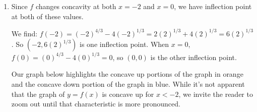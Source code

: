 \documentclass{ximera}
\begin{document}
\begin{example}
\begin{explanation}
\begin{enumerate}
\begin{image}
\end{image}

Using Theorem \ref{secondderivatveandgraphs} we get:

\begin{image}
\end{image}

We see $f$ is concave up on $(-\infty, -2)$ and again from $(0, \infty)$.  $f$ is concave down on $(-2,0)$.

\item  Since $f$ changes concavity at both $x=-2$ and $x=0$, we have inflection point at both of these values.  



We find:  $f(-2) = (-2)^{4/3} - 4(-2)^{1/3} = 2 (2)^{1/3} + 4 (2)^{1/3} = 6 (2)^{1/3}$. So $\left(-2, 6 (2)^{1/3} \right)$ is one inflection point.  When $x = 0$, $f(0) = (0)^{4/3} - 4(0)^{1/3}  = 0$, so $(0,0)$ is the other inflection point.  


Our graph below highlights the concave up portions of the graph in orange and the concave down portion of the graph in blue.  While it's not apparent that the graph of $y=f(x)$ is concave up for $x<-2$, we invite the reader to zoom out until that characteristic is more pronounced.


\begin{center}
\end{center}


\end{enumerate}
\end{explanation}

\end{example}
\end{document}
